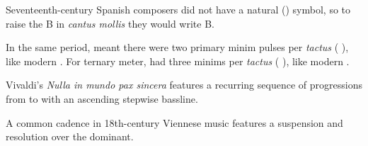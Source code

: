 \documentclass{article}
\begin{document}
Seventeenth-century Spanish composers did not have a natural (\na) symbol, so
to raise the B\fl{} in \emph{cantus mollis} they would write B\sh{}.

In the same period, \meterC{} meant there were two primary minim pulses per
\emph{tactus} (\musMinim{} \musMinim{}), like modern .
For ternary meter, \meterCThree{} had three minims per \emph{tactus}
(\musMinim{} \musMinim{} \musMinim{}), like modern .

Vivaldi's \emph{Nulla in mundo pax sincera} features a recurring sequence of
progressions from  to  with an ascending stepwise bassline.

A common cadence in 18th-century Viennese music features a 
suspension and resolution over the dominant.
\end{document}
